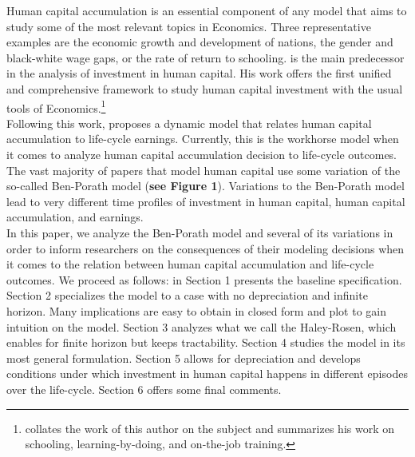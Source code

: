 \noindent Human capital accumulation is an essential component of any model that aims to study some of the most relevant topics in Economics. Three representative examples are the economic growth and development of nations, the gender and black-white wage gaps, or the rate of return to schooling. \citet{becker1962investment} is the main predecessor in the analysis of investment in human capital. His work offers the first unified and comprehensive framework to study human capital investment with the usual tools of Economics.\footnote{\citet{becker2009human} collates the work of this author on the subject and summarizes his work on schooling, learning-by-doing, and on-the-job training.} \\
\indent Following this work, \citet{ben1967production} proposes a dynamic model that relates human capital accumulation to life-cycle earnings. Currently, this is the workhorse model when it comes to analyze human capital accumulation decision to life-cycle outcomes. The vast majority of papers that model human capital use some variation of the so-called Ben-Porath model (\textbf{see Figure 1}). Variations to the Ben-Porath model lead to very different time profiles of investment in human capital, human capital accumulation, and earnings.\\
\indent In this paper, we analyze the Ben-Porath model and several of its variations in order to inform researchers on the consequences of their modeling decisions when it comes to the relation between human capital accumulation and life-cycle outcomes. We proceed as follows: in Section 1 presents the baseline specification. Section 2 specializes the model to a case with no depreciation and infinite horizon. Many implications are easy to obtain in closed form and plot to gain intuition on the model. Section 3 analyzes what we call the Haley-Rosen, which enables for finite horizon but keeps tractability. Section 4 studies the model in its most general formulation. Section 5 allows for depreciation and develops conditions under which investment in human capital happens in different episodes over the life-cycle. Section 6 offers some final comments. \\

